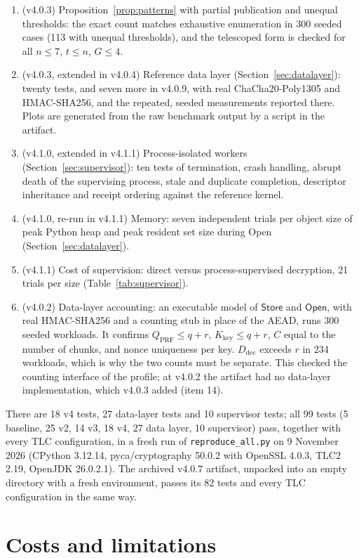 \documentclass[pdflatex,sn-mathphys-num,twocolumn]{sn-jnl}
\theoremstyle{plain}
\theoremstyle{definition}
\newcommand{\code}[1]{\texttt{#1}}
\begin{document}
\begin{enumerate}
\item (v4.0.3) Proposition~\ref{prop:patterns} with partial publication and unequal thresholds: the exact count matches exhaustive enumeration in 300 seeded cases (113 with unequal thresholds), and the telescoped form is checked for all $n\le7$, $t\le n$, $G\le4$.
\item (v4.0.3, extended in v4.0.4) Reference data layer (Section~\ref{sec:datalayer}): twenty tests, and seven more in v4.0.9, with real ChaCha20-Poly1305 and HMAC-SHA256, and the repeated, seeded measurements reported there. Plots are generated from the raw benchmark output by a script in the artifact.
\item (v4.1.0, extended in v4.1.1) Process-isolated workers (Section~\ref{sec:supervisor}): ten tests of termination, crash handling, abrupt death of the supervising process, stale and duplicate completion, descriptor inheritance and receipt ordering against the reference kernel.
\item (v4.1.0, re-run in v4.1.1) Memory: seven independent trials per object size of peak Python heap and peak resident set size during Open (Section~\ref{sec:datalayer}).
\item (v4.1.1) Cost of supervision: direct versus process-supervised decryption, 21 trials per size (Table~\ref{tab:supervisor}).
\item (v4.0.2) Data-layer accounting: an executable model of $\mathsf{Store}$ and $\mathsf{Open}$, with real HMAC-SHA256 and a counting stub in place of the AEAD, runs 300 seeded workloads. It confirms $Q_{\mathrm{PRF}}\le q+r$, $K_{\mathrm{key}}\le q+r$, $C$ equal to the number of chunks, and nonce uniqueness per key. $D_{\mathrm{dec}}$ exceeds $r$ in 234 workloads, which is why the two counts must be separate. This checked the counting interface of the profile; at v4.0.2 the artifact had no data-layer implementation, which v4.0.3 added (item 14).
\end{enumerate}
There are 18 v4 tests, 27 data-layer tests and 10 supervisor tests; all 99 tests (5 baseline, 25 v2, 14 v3, 18 v4, 27 data layer, 10 supervisor) pass, together with every TLC configuration, in a fresh run of \code{reproduce\_all.py} on 9 November 2026 (CPython 3.12.14, pyca/cryptography 50.0.2 with OpenSSL 4.0.3, TLC2 2.19, OpenJDK 26.0.2.1). The archived v4.0.7 artifact, unpacked into an empty directory with a fresh environment, passes its 82 tests and every TLC configuration in the same way.


\section{Costs and limitations}\label{sec:limits}
\end{document}
